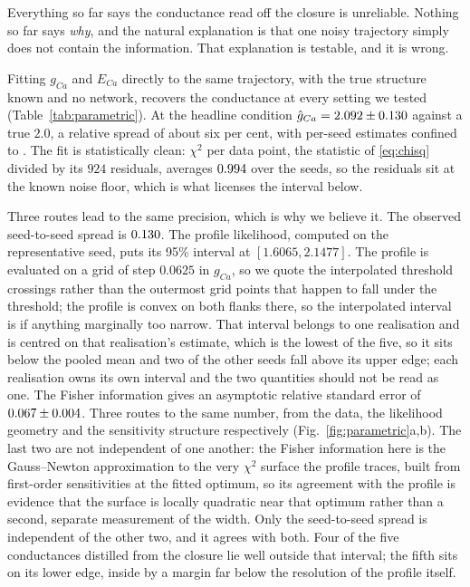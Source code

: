 \documentclass{article}
\newcommand{\Ttrain}{30}       %
\newcommand{\Ntrain}{154}      %
\newcommand{\Nchisq}{924}      %
\newcommand{\gcaMain}{2.0}     %
\newcommand{\ProfileStep}{0.0625}   %
\begin{document}
Everything so far says the conductance read off the closure is unreliable.
Nothing so far says \emph{why}, and the natural explanation is that one noisy
trajectory simply does not contain the information. That explanation is testable,
and it is wrong.

Fitting $g_{Ca}$ and $E_{Ca}$ directly to the same trajectory, with the true
structure known and no network, recovers the conductance at every setting we
tested (Table~\ref{tab:parametric}). At the headline condition
$\hat g_{Ca} = 2.092 \pm 0.130$ against a true $\gcaMain$, a
relative spread of about six per cent, with per-seed estimates confined to
\valParamFitGcaHatRangeTwo. The fit is statistically clean:
$\chi^2$ per data point, the statistic of \eqref{eq:chisq} divided by its
$\Nchisq$ residuals, averages $0.994$ over the seeds, so
the residuals sit at the known noise floor, which is what licenses the interval
below.

Three routes lead to the same precision, which is why we believe it.
The observed seed-to-seed spread is $0.130$. The
profile likelihood, computed on the representative seed, puts its 95\% interval %
at $[1.6065, 2.1477]$. %
The profile is evaluated on a grid of step $\ProfileStep$ in $g_{Ca}$, so we
quote the interpolated threshold crossings rather than the outermost grid points
that happen to fall under the threshold; the profile is convex on both flanks
there, so the interpolated interval is if anything marginally too narrow.
That interval belongs to one realisation and is centred on that realisation's
estimate, which is the lowest of the five, so it sits below the pooled mean and
two of the other seeds fall above its upper edge; %
each realisation owns its own interval and the two quantities should not be read
as one. The Fisher information gives an asymptotic relative standard error of
$0.067 \pm 0.004$. Three routes to the same number, from the data, the
likelihood geometry and the sensitivity structure respectively
(Fig.~\ref{fig:parametric}a,b). The last two are not independent of one another:
the Fisher information here is the Gauss--Newton approximation to the very
$\chi^2$ surface the profile traces, built from first-order sensitivities at the
fitted optimum, so its agreement with the profile is evidence that the surface is
locally quadratic near that optimum rather than a second, separate measurement of
the width. Only the seed-to-seed spread is independent of the other two, and it
agrees with both. Four of the five conductances distilled from the closure lie
well outside that interval; the fifth sits on its lower edge, inside by a margin
far below the resolution of the profile itself. %
\end{document}
